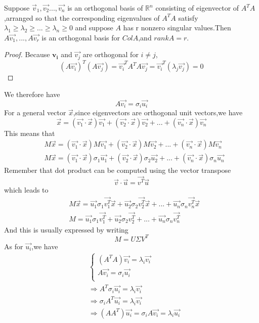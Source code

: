 \begin{theorem}
	Suppose {$\vec{v}_1,\vec{v_2}...,\vec{v_n}$} is an orthogonal basis of $\mathbb{R}^n$ consisting of eigenvector of $A^TA$,arranged so that the corresponding eigenvalues of  $A^TA$ satisfy $\lambda_1 \geq \lambda_2 \geq...\geq \lambda_n \geq 0$  and suppose $A$ has r nonzero singular values.Then {$A\vec{v_1},...,A\vec{v_r}$} is an orthogonal basis for $ColA$,and $rankA=r$. 
\end{theorem}
\begin{proof}
	Because $\mathbf{v_i}$ and $\vec{v_j}$ are orthogonal for $i\neq j$,
	\begin{equation}
	(A\vec{v_i})^T(A\vec{v_j}) = \vec{v_i}^TA^TA\vec{v_j} = \vec{v_i}^T(\lambda_j\vec{v_j})=0
	\end{equation} 
\end{proof}
We therefore have
\begin{equation}
A\vec{v_i} = \sigma_i\vec{u_i}
\end{equation}
For a general vector $\vec{x}$,since eigenvectors are orthogonal unit vectors,we have
\begin{equation}
\vec{x} = (\vec{v_1}\cdot\vec{x})\vec{v_1} + (\vec{v_2}\cdot\vec{x})\vec{v_2} +...+(\vec{v_n}\cdot\vec{x})\vec{v_n}
\end{equation}
This means that
\begin{align}
& M\vec{x} = (\vec{v_1}\cdot\vec{x})M\vec{v_1} + (\vec{v_2}\cdot\vec{x})M\vec{v_2} +...+(\vec{v_n}\cdot\vec{x})M\vec{v_n} \\
& M\vec{x} = (\vec{v_1}\cdot\vec{x})\sigma_1\vec{u_1} + (\vec{v_2}\cdot\vec{x})\sigma_2\vec{u_2} +...+(\vec{v_n}\cdot\vec{x})\sigma_n\vec{u_n}
\end{align}
Remember that dot product can be computed using the vector transpose
\begin{equation}
\vec{v}\cdot\vec{u} = \vec{v^T}\vec{u}
\end{equation}
which leads to
\begin{align}
& M\vec{x} = \vec{u_1}\sigma_1\vec{v_1^T}\vec{x}+\vec{u_2}\sigma_2\vec{v_2^T}\vec{x}+...+\vec{u_n}\sigma_n\vec{v_n^T}\vec{x} \\
&  M = \vec{u_1}\sigma_1\vec{v_1^T}+\vec{u_2}\sigma_2\vec{v_2^T}+...+\vec{u_n}\sigma_n\vec{v_n^T}
\end{align}
And this is usually expressed by writing 
\begin{equation}
M = U\Sigma V^T
\end{equation}
As for $\vec{u_i}$,we have
\begin{align*}
&\begin{cases}
(A^TA)\vec{v_i} = \lambda_i\vec{v_i}	\\
A\vec{v_i}    = \sigma_i\vec{u_i}	\\
\end{cases} \\
&\Rightarrow A^T\sigma_i\vec{u_i} = \lambda_i\vec{v_i} \\
&\Rightarrow \sigma_iA^T\vec{u_i} = \lambda_i\vec{v_i}\\
&\Rightarrow (AA^T)\vec{u_i}=\sigma_iA\vec{v_i} = \lambda_i\vec{u_i}\\
\end{align*}
